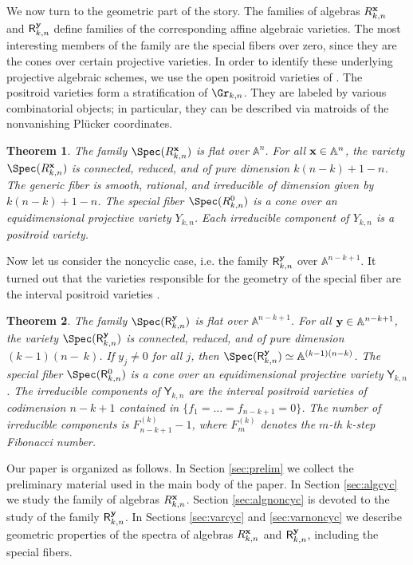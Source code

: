 \documentclass[11pt]{amsart}
\numberwithin{equation}{section}
\newtheorem{theoremA}{Theorem}
\newcommand{\bA}{{\mathbb A}}
\newcommand{\bfx}{{\bf x}}
\newcommand{\bfy}{{\bf y}}
\begin{document}
We now turn to the geometric part of the story. The families of algebras $R_{k,n}^\bfx$ and
${\mathsf R}_{k,n}^\bfy$ define families of the corresponding affine algebraic varieties. The most 
interesting members of the family are the special fibers over zero, since they are the cones over 
certain projective varieties. In order to identify these underlying projective algebraic schemes, we use
the open positroid varieties of \cite{KLS13,KLS14}. The positroid varieties form a stratification of
$\Gr_{k,n}$. They are labeled by various combinatorial objects; in particular, they can be described 
via matroids of the nonvanishing Pl\"ucker coordinates. 


\begin{theoremA}
The family $\Spec(R^\bfx_{k,n})$ is flat over $\bA^n$. 
For all $\bfx\in \bA^n$, the variety $\Spec(R^\bfx_{k,n})$ is connected, reduced, and of pure dimension 
$k(n-k)+1-n$. 
The generic fiber is smooth, rational, and irreducible of dimension given by $k(n-k)+1-n$. The special fiber $\Spec(R^0_{k,n})$ is a cone over 
an equidimensional projective variety $Y_{k,n}$. Each irreducible
component of $Y_{k,n}$ is a positroid variety. 
\end{theoremA}

Now let us consider the noncyclic case, i.e. the family ${\mathsf R}^\bfy_{k,n}$ over $\bA^{n-k+1}$.
It turned out that the varieties responsible for the geometry of the special fiber are the
interval positroid varieties \cite{Kn14,KL14,Paw18}. 

\begin{theoremA}
The family $\Spec({\mathsf R}^\bfy_{k,n})$ is flat over $\bA^{n-k+1}$.
For all $\bfy\in \bA^{n-k+1}$, the variety $\Spec({\mathsf R}^\bfy_{k,n})$ is connected, reduced, and of pure dimension 
$(k-1)(n-~k)$. 
If $y_j\ne 0$ for all $j$, then $\Spec({\mathsf R}^\bfy_{k,n})\simeq \bA^{(k-1)(n-k)}$. The special fiber $\Spec({\mathsf R}^0_{k,n})$ is a cone over 
an equidimensional projective variety ${\mathsf Y}_{k,n}$. The irreducible 
components of ${\mathsf Y}_{k,n}$ are the interval positroid varieties of codimension $n-k+1$ contained in $\{f_1=\dots=f_{n-k+1}=0\}$. 
The number of irreducible components is
$F_{n-k+1}^{(k)}-1$, where $F_m^{(k)}$
denotes the $m$-th $k$-step Fibonacci number. 
\end{theoremA}

Our paper is organized as follows. In Section \ref{sec:prelim} we collect the preliminary
material used in the main body of the paper. In Section \ref{sec:algcyc} we study the
family of algebras $R^\bfx_{k,n}$. Section \ref{sec:algnoncyc} is devoted to the study
of the family ${\mathsf R}^\bfy_{k,n}$. In Sections \ref{sec:varcyc} and \ref{sec:varnoncyc}
we describe geometric properties of the spectra of algebras $R^\bfx_{k,n}$
and ${\mathsf R}^\bfy_{k,n}$, including the special fibers. 
\end{document}
